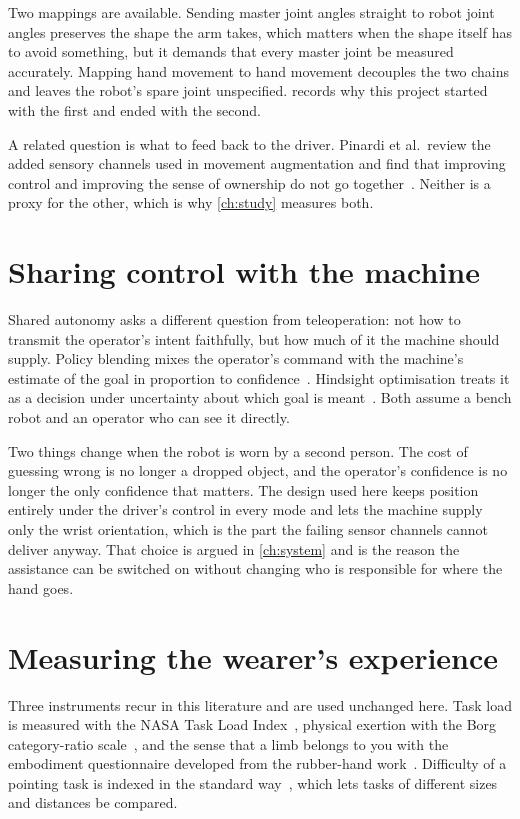 Two mappings are available. Sending master joint angles straight to robot
joint angles preserves the shape the arm takes, which matters when the shape
itself has to avoid something, but it demands that every master joint be
measured accurately. Mapping hand movement to hand movement decouples the two
chains and leaves the robot's spare joint unspecified. 
records why this project started with the first and ended with the second.

A related question is what to feed back to the driver. Pinardi et al.\ review
the added sensory channels used in movement augmentation and find that
improving control and improving the sense of ownership do not go
together~\cite{pinardi2023feedback}. Neither is a proxy for the other, which is
why \cref{ch:study} measures both.

\section{Sharing control with the machine}

Shared autonomy asks a different question from teleoperation: not how to
transmit the operator's intent faithfully, but how much of it the machine
should supply. Policy blending mixes the operator's command with the
machine's estimate of the goal in proportion to
confidence~\cite{dragan2013policyblending}. Hindsight optimisation treats it
as a decision under uncertainty about which goal is
meant~\cite{javdani2015hindsight}. Both assume a bench robot and an operator
who can see it directly.

Two things change when the robot is worn by a second person. The cost of
guessing wrong is no longer a dropped object, and the operator's confidence is
no longer the only confidence that matters. The design used here keeps
position entirely under the driver's control in every mode and lets the
machine supply only the wrist orientation, which is the part the failing
sensor channels cannot deliver anyway. That choice is argued in
\cref{ch:system} and is the reason the assistance can be switched on without
changing who is responsible for where the hand goes.

\section{Measuring the wearer's experience}

Three instruments recur in this literature and are used unchanged here. Task
load is measured with the NASA Task Load Index~\cite{hart1988nasatlx}, physical
exertion with the Borg category-ratio scale~\cite{borg1982perceived}, and the
sense that a limb belongs to you with the embodiment questionnaire developed
from the rubber-hand work~\cite{longo2008embodiment,botvinick1998rubber}.
Difficulty of a pointing task is indexed in the standard
way~\cite{fitts1954information}, which lets tasks of different sizes and
distances be compared.

